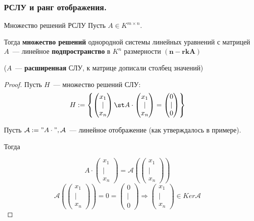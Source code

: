 \subsubsection{РСЛУ и ранг отображения.}

\begin{Theorem}{Множество решений РСЛУ}{}
    Пусть $A \in K^{m \times n}$.

    Тогда \textbf{множество решений} однородной системы линейных уравнений с матрицей $A$~---
     линейное \textbf{подпространство} в $K^n$ размерности $(\mathbf{n - rk A})$

    ($A$~--- \textbf{расширенная} СЛУ, к матрице дописали столбец значений)
\end{Theorem}

\begin{proof}
    Пусть $H$~--- множество решений СЛУ:
    \[
    H := \left\{ 
    \begin{pmatrix} x_1 \\ | \\ x_n \end{pmatrix} \st
    A \cdot 
    \begin{pmatrix} x_1 \\ | \\ x_n \end{pmatrix} = 
    \begin{pmatrix} 0 \\ | \\ 0 \end{pmatrix}
    \right\} 
    \] 

    Пусть $\mathcal{A} := "A \cdot", \mathcal{A}$~--- линейное отображение (как утверждалось в примере).

    Тогда

    \[
    A \cdot 
    \begin{pmatrix} x_1 \\ | \\ x_n \end{pmatrix} = 
    \mathcal{A}\left(\begin{pmatrix} x_1 \\ | \\ x_n \end{pmatrix}\right)
    \]
    \[
    \mathcal{A}(\begin{pmatrix} x_1 \\ | \\ x_n \end{pmatrix}) = 0 = \begin{pmatrix} 0 \\ | \\ 0 \end{pmatrix} \Rightarrow
    \begin{pmatrix} x_1 \\ | \\ x_n \end{pmatrix} \in Ker \mathcal{A}
    \]


\end{proof}
